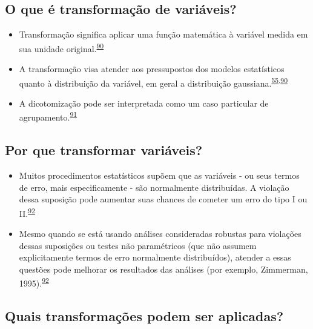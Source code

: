 \documentclass[
  a4paper,
]{book}
\begin{document}
\hypertarget{o-que-uxe9-transformauxe7uxe3o-de-variuxe1veis}{%
\subsection{O que é transformação de variáveis?}\label{o-que-uxe9-transformauxe7uxe3o-de-variuxe1veis}}

\begin{itemize}
\item
  Transformação significa aplicar uma função matemática à variável medida em sua unidade original.\textsuperscript{\protect\hyperlink{ref-Bland1996}{90}}
\item
  A transformação visa atender aos pressupostos dos modelos estatísticos quanto à distribuição da variável, em geral a distribuição gaussiana.\textsuperscript{\protect\hyperlink{ref-vetter2017}{55},\protect\hyperlink{ref-Bland1996}{90}}
\item
  A dicotomização pode ser interpretada como um caso particular de agrupamento.\textsuperscript{\protect\hyperlink{ref-Fedorov2009}{91}}
\end{itemize}

\hypertarget{por-que-transformar-variuxe1veis}{%
\subsection{Por que transformar variáveis?}\label{por-que-transformar-variuxe1veis}}

\begin{itemize}
\item
  Muitos procedimentos estatísticos supõem que as variáveis - ou seus termos de erro, mais especificamente - são normalmente distribuídas. A violação dessa suposição pode aumentar suas chances de cometer um erro do tipo I ou II.\textsuperscript{\protect\hyperlink{ref-osborne2010}{92}}
\item
  Mesmo quando se está usando análises consideradas robustas para violações dessas suposições ou testes não paramétricos (que não assumem explicitamente termos de erro normalmente distribuídos), atender a essas questões pode melhorar os resultados das análises (por exemplo, Zimmerman, 1995).\textsuperscript{\protect\hyperlink{ref-osborne2010}{92}}
\end{itemize}

\hypertarget{quais-transformauxe7uxf5es-podem-ser-aplicadas}{%
\subsection{Quais transformações podem ser aplicadas?}\label{quais-transformauxe7uxf5es-podem-ser-aplicadas}}
\end{document}
